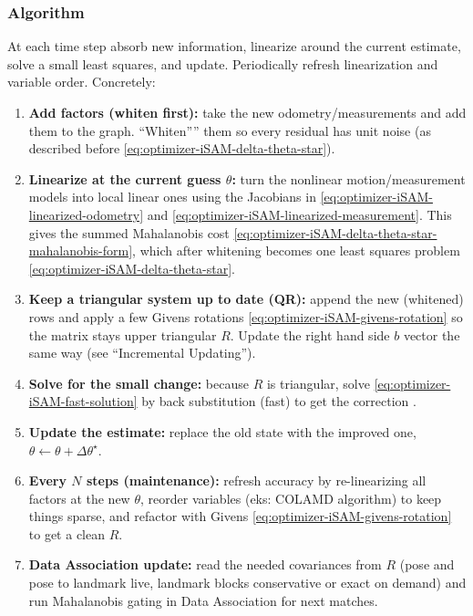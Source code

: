\subsubsection{Algorithm}
At each time step absorb new information, linearize around the current estimate, solve a small least squares, and update. Periodically refresh linearization and variable order. Concretely:
\begin{enumerate}
    \item \textbf{Add factors (whiten first):} take the new odometry/measurements and add them to the graph. ``Whiten”'' them so every residual has unit noise (as described before \eqref{eq:optimizer-iSAM-delta-theta-star}).

    \item \textbf{Linearize at the current guess \(\theta\):} turn the nonlinear motion/measurement models into local linear ones using the Jacobians in
    \eqref{eq:optimizer-iSAM-linearized-odometry} and \eqref{eq:optimizer-iSAM-linearized-measurement}. This gives the summed Mahalanobis cost \eqref{eq:optimizer-iSAM-delta-theta-star-mahalanobis-form}, which after whitening becomes one least squares problem \eqref{eq:optimizer-iSAM-delta-theta-star}.

    \item \textbf{Keep a triangular system up to date (QR):} append the new (whitened) rows and apply a few Givens rotations \eqref{eq:optimizer-iSAM-givens-rotation} so the matrix stays upper triangular $R$. Update the right hand side $b$ vector the same way (see ``Incremental Updating'').

    \item \textbf{Solve for the small change:} because $R$ is triangular, solve
    \eqref{eq:optimizer-iSAM-fast-solution} by back substitution (fast) to get the correction .

    \item \textbf{Update the estimate:} replace the old state with the improved one,
    $\theta \leftarrow \theta + \Delta\theta^\star$.

    \item \textbf{Every \(N\) steps (maintenance):} refresh accuracy by re-linearizing all factors at the new $\theta$, reorder variables (eks: COLAMD algorithm) to keep things sparse, and refactor with Givens \eqref{eq:optimizer-iSAM-givens-rotation} to get a clean $R$.

    \item \textbf{Data Association update:} read the needed covariances from $R$ (pose and pose to landmark live, landmark blocks conservative or exact on demand) and run Mahalanobis gating in Data Association for next matches.
\end{enumerate}



